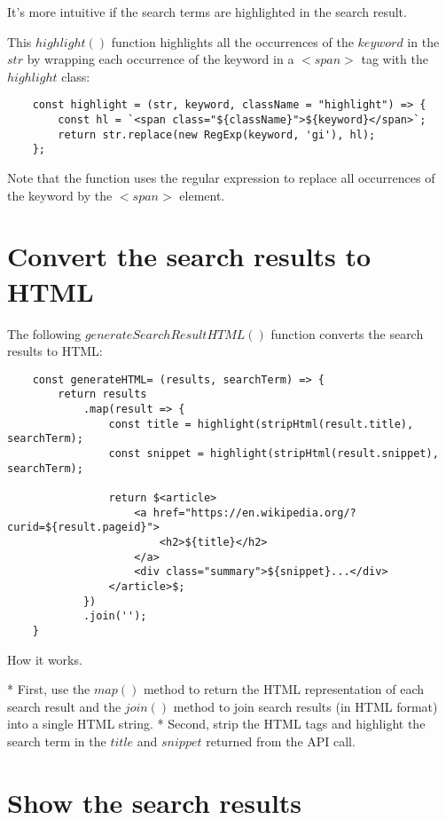 \documentclass[11pt]{article}
\begin{document}
It's more intuitive if the search terms are highlighted in the search result.

This $highlight()$ function highlights all the occurrences of the
$keyword$ in the $str$ by wrapping each occurrence of the keyword in
a $<span>$ tag with the $highlight$ class:

\begin{lstlisting}
    const highlight = (str, keyword, className = "highlight") => {
        const hl = `<span class="${className}">${keyword}</span>`;
        return str.replace(new RegExp(keyword, 'gi'), hl);
    };
\end{lstlisting}

Note that the function uses the regular expression to replace all
occurrences of the keyword by the $<span>$ element.

\section*{Convert the search results to HTML}

The following $generateSearchResultHTML()$ function converts the search
results to HTML:

\begin{lstlisting}
    const generateHTML= (results, searchTerm) => {
        return results
            .map(result => {
                const title = highlight(stripHtml(result.title), searchTerm);
                const snippet = highlight(stripHtml(result.snippet), searchTerm);

                return $<article>
                    <a href="https://en.wikipedia.org/?curid=${result.pageid}">
                        <h2>${title}</h2>
                    </a>
                    <div class="summary">${snippet}...</div>
                </article>$;
            })
            .join('');
    }
\end{lstlisting}

How it works.

* First, use the $map()$ method to return the HTML representation of each
search result and the $join()$ method to join search results
(in HTML format) into a single HTML string.
* Second, strip the HTML tags and highlight the search term in
the $title$ and $snippet$ returned from the API call.

\section*{Show the search results}
\end{document}
